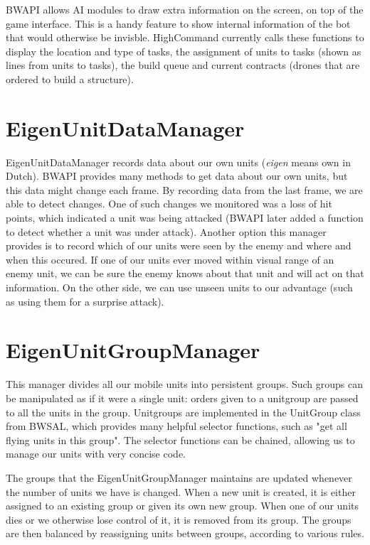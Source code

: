 BWAPI allows AI modules to draw extra information on the screen, on top of the game interface. This is a handy feature to show internal information of the bot that would otherwise be invisble. HighCommand currently calls these functions to display the location and type of tasks, the assignment of units to tasks (shown as lines from units to tasks), the build queue and current contracts (drones that are ordered to build a structure).

\section{EigenUnitDataManager}

EigenUnitDataManager records data about our own units (\emph{eigen} means own in Dutch). BWAPI provides many methods to get data about our own units, but this data might change each frame. By recording data from the last frame, we are able to detect changes. One of such changes we monitored was a loss of hit points, which indicated a unit was being attacked (BWAPI later added a function to detect whether a unit was under attack). Another option this manager provides is to record which of our units were seen by the enemy and where and when this occured. If one of our units ever moved within visual range of an enemy unit, we can be sure the enemy knows about that unit and will act on that information. On the other side, we can use unseen units to our advantage (such as using them for a surprise attack).

\section{EigenUnitGroupManager}

This manager divides all our mobile units into persistent groups. Such groups can be manipulated as if it were a single unit: orders given to a unitgroup are passed to all the units in the group. Unitgroups are implemented in the UnitGroup class from BWSAL, which provides many helpful selector functions, such as "get all flying units in this group". The selector functions can be chained, allowing us to manage our units with very concise code.

The groups that the EigenUnitGroupManager maintains are updated whenever the number of units we have is changed. When a new unit is created, it is either assigned to an existing group or given its own new group. When one of our units dies or we otherwise lose control of it, it is removed from its group. The groups are then balanced by reassigning units between groups, according to various rules.


